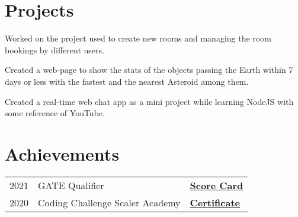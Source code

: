\documentclass[]{deedy-resume-openfont}
\begin{document}
\begin{minipage}[t]{0.66\textwidth}
\section{Projects}
{\href{https://github.com/Niharika100/Niharika100-bookRoom_backend}{\bf{}}}
Worked on the project used to create new rooms and managing the room bookings by different users.  
\sectionsep

{\href{https://niharika100.github.io/nearEarthObjectStats/}{\bf{}}}
Created a web-page to show the stats of the objects passing the Earth within 7 days or less with the fastest and the nearest Asteroid among them. 
\sectionsep

{\href{https://github.com/Niharika100/WebChatApp}{\bf{}}}
Created a real-time web chat app as a mini project while learning NodeJS with some reference of YouTube.
\sectionsep


\section{Achievements} 
\begin{tabular}{rll}
2021	     & GATE Qualifier  & \bf{\href{https://drive.google.com/file/d/15GE8USUrYsOLWMyxbJCKXGUEODwfVKVF/view?usp=sharing}{Score Card}}\\
2020     & Coding Challenge Scaler Academy &  \bf{\href{https://drive.google.com/file/d/1FvnQb3Byb9vj0uEbBudwzwYHRNe2MFp1/view}{Certificate}} \\
\end{tabular}
\sectionsep

\end{minipage} 
\end{document}
